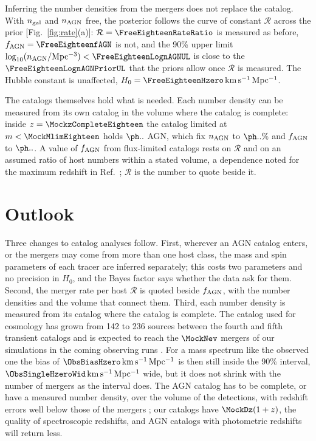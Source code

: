 \documentclass[aps,prd,reprint,superscriptaddress,nofootinbib,nolongbibliography,floatfix]{revtex4-2}
\newcommand{\kms}{\,\mathrm{km\,s^{-1}\,Mpc^{-1}}}
\newcommand{\fagn}{f_{\rm AGN}}
\newcommand{\RR}{\mathcal{R}}
\begin{document}
Inferring the number densities from the mergers does not replace the catalog.
With $n_{\rm gal}$ and $n_{\rm AGN}$ free, the posterior follows the curve of constant $\RR$ across the prior [Fig.~\ref{fig:rate}(a)]: $\RR=\FreeEighteenRateRatio$ is measured as before, $\fagn=\FreeEighteenfAGN$ is not, and the 90\% upper limit $\log_{10}(n_{\rm AGN}/{\rm Mpc^{-3}})<\FreeEighteenLognAGNUL$ is close to the $\FreeEighteenLognAGNPriorUL$ that the priors allow once $\RR$ is measured. %
The Hubble constant is unaffected, $H_0=\FreeEighteenHzero\kms$. %

The catalogs themselves hold what is needed.
Each number density can be measured from its own catalog in the volume where the catalog is complete: inside $z=\MockzCompleteEighteen$ the catalog limited at $m<\MockMlimEighteen$ holds $\MockNAGNCompleteEighteen$ AGN, which fix $n_{\rm AGN}$ to $\MocknAGNPrecEighteen\%$ and $\fagn$ to $\NormDeltafCountsEighteen$. %
A value of $\fagn$ from flux-limited catalogs rests on $\RR$ and on an assumed ratio of host numbers within a stated volume, a dependence noted for the maximum redshift in Ref.~\cite{Pouw:2026lar}; $\RR$ is the number to quote beside it.

\section{Outlook}
\label{sec:outlook}

Three changes to catalog analyses follow.
First, wherever an AGN catalog enters, or the mergers may come from more than one host class, the mass and spin parameters of each tracer are inferred separately; this costs two parameters and no precision in $H_0$, and the Bayes factor says whether the data ask for them. %
Second, the merger rate per host $\RR$ is quoted beside $\fagn$, with the number densities and the volume that connect them.
Third, each number density is measured from its catalog where the catalog is complete.
The catalog used for cosmology has grown from 142 to 236 sources between the fourth and fifth transient catalogs \cite{LIGOScientific:2025jau,LIGOScientific:2026uyd} and is expected to reach the $\MockNev$ mergers of our simulations in the coming observing runs \cite{KAGRA:2013rdx}.
For a mass spectrum like the observed one the bias of $\ObsBiasHzero\kms$ is then still inside the 90\% interval, $\ObsSingleHzeroWid\kms$ wide, but it does not shrink with the number of mergers as the interval does. %
The AGN catalog has to be complete, or have a measured number density, over the volume of the detections, with redshift errors well below those of the mergers \cite{Pouw:2026lar}; our catalogs have $\MockDz(1+z)$, the quality of spectroscopic redshifts, and AGN catalogs with photometric redshifts will return less.
\end{document}
